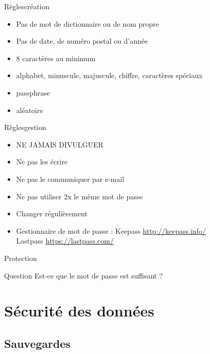 \documentclass[12pt]{beamer}
\begin{document}
		\begin{frame}{Règles}{création}
			\begin{itemize}
				\item Pas de mot de dictionnaire ou de nom propre
				\item Pas de date, de numéro postal ou d'année
				\item 8 caractères au minimum
				\item alphabet, minuscule, majuscule, chiffre, caractères spéciaux
				\item passphrase
				\item aléatoire
			\end{itemize}
		\end{frame}
		
		\begin{frame}{Règles}{gestion}
			\begin{itemize}			
				\item \alert{NE JAMAIS DIVULGUER}
				\item Ne pas les écrire
				\item Ne pas le communiquer par e-mail
				\item Ne pas utiliser 2x le même mot de passe
				\item Changer régulièrement
				\item Gestionnaire de mot de passe : Keepass \url{http://keepass.info/} \\
					Lastpass \url{https://lastpass.com/}
			\end{itemize}
		\end{frame}
		
		\begin{frame}{Protection}
			\begin{exampleblock}{Question}
				Est-ce que le mot de passe est suffisant ?
			\end{exampleblock}			
		\end{frame}



\section{Sécurité des données}

	\subsection{Sauvegardes}
	
\end{document}
